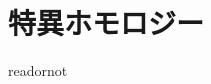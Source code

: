 \documentclass{jsarticle}
\begin{document}
\fi

\section{特異ホモロジー}

\expandafter\ifx\csname readornot\endcsname\relax
  
\end{document}
